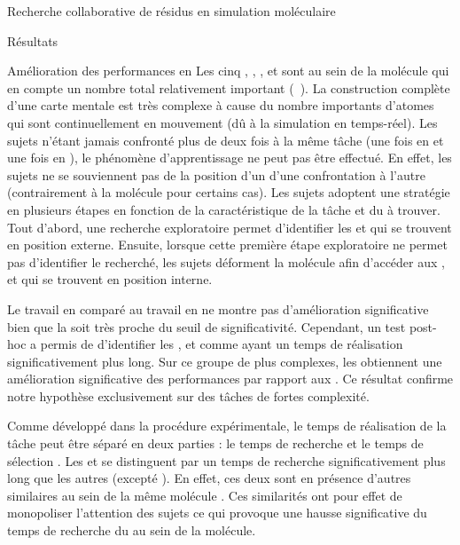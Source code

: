 \documentclass[myfrancais]{mythesis}
\begin{document}
\begin{mychapter}{Recherche collaborative de résidus en simulation moléculaire}
\begin{mysection}{Résultats}
\begin{mysubsection}{Amélioration des performances en }
				Les cinq  , , ,  et  sont au sein de la molécule \myPrion qui en compte un nombre total relativement important (~).
				La construction complète d'une carte mentale est très complexe à cause du nombre importants d'atomes qui sont continuellement en mouvement (dû à la simulation en temps-réel).
				Les sujets n'étant jamais confronté plus de deux fois à la même tâche (une fois en  et une fois en ), le phénomène d'apprentissage ne peut pas être effectué.
				En effet, les sujets ne se souviennent pas de la position d'un  d'une confrontation à l'autre (contrairement à la molécule \myTRPCAGE pour certains cas).
				Les sujets adoptent une stratégie en plusieurs étapes en fonction de la caractéristique de la tâche et du  à trouver.
				Tout d'abord, une recherche exploratoire permet d'identifier les   et  qui se trouvent en position externe.
				Ensuite, lorsque cette première étape exploratoire ne permet pas d'identifier le  recherché, les sujets déforment la molécule afin d'accéder aux  ,  et  qui se trouvent en position interne.

				Le travail en  comparé au travail en  ne montre pas d'amélioration significative bien que la \mypvalue soit très proche du seuil de significativité.
				Cependant, un test post-hoc a permis de d'identifier les  ,  et  comme ayant un temps de réalisation significativement plus long.
				Sur ce groupe de  plus complexes, les  obtiennent une amélioration significative des performances par rapport aux .
				Ce résultat confirme notre hypothèse  exclusivement sur des tâches de fortes complexité.

				Comme développé dans la procédure expérimentale, le temps de réalisation de la tâche peut être séparé en deux parties : le temps de recherche et le temps de sélection .
				Les   et  se distinguent par un temps de recherche significativement plus long que les autres  (excepté ).
				En effet, ces deux  sont en présence d'autres  similaires au sein de la même molécule .
				Ces similarités ont pour effet de monopoliser l'attention des sujets ce qui provoque une hausse significative du temps de recherche du  au sein de la molécule.


\end{mysubsection}
\end{mysection}
\end{mychapter}
\end{document}
